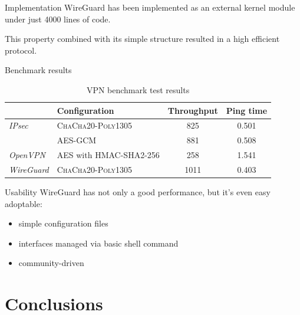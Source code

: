 \documentclass[light]{presenta}
\begin{document}
\begin{frame}{Implementation}
  WireGuard has been implemented as an external kernel module under just 4000 lines of code.
  
  \bigskip
  This property combined with its simple structure resulted in a high efficient protocol.
\end{frame}

\begin{frame}{Benchmark results}
  \begin{table}[H]
    \centering
    \caption{VPN benchmark test results}
    \label{table:benchmark}
    \begin{tabular}{|l|l|c|c|}
      \hline
      & \textbf{Configuration} & \textbf{Throughput}\footnotemark {[Mbps]} & \textbf{Ping time}\footnotemark {[s]}\\
      \hline
      \textsl{IPsec} & \textsc{ChaCha20-Poly1305} & 825 & 0.501\\
            & AES-GCM & 881 & 0.508\\
      \textsl{OpenVPN} & AES with HMAC-SHA2-256 & 258 & 1.541\\
      \textsl{WireGuard} & \textsc{ChaCha20-Poly1305} & \cellcolor{blue!60} 1011 & \cellcolor{blue!60} 0.403 \\
      \hline
    \end{tabular}
  \end{table}
\end{frame}

\begin{frame}{Usability}
  WireGuard has not only a good performance, but it's even easy adoptable:
  \begin{itemize}
    \item simple configuration files
    \pause
    \item interfaces managed via basic shell command
    \pause
    \item community-driven
  \end{itemize}
\end{frame}

\section{Conclusions}
\end{document}
